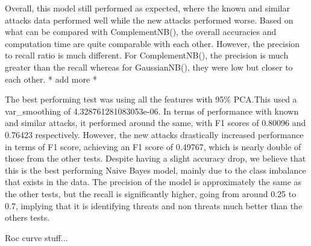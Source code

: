 Overall, this model still performed as expected, where the known and similar attacks data performed well while the new attacks performed worse. Based on what can be compared with ComplementNB(), the overall accuracies and computation time are quite comparable with each other. However, the precision to recall ratio is much different. For ComplementNB(), the precision is much greater than the recall whereas for GaussianNB(), they were low but closer to each other. * add more *

The best performing test was using all the features with 95\% PCA.This used a var\_smoothing of 4.328761281083053e-06. In terms of performance with known and similar attacks, it performed around the same, with F1 scores of 0.80096 and 0.76423 respectively. However, the new attacks drastically increased performance in terms of F1 score, achieving an F1 score of 0.49767, which is nearly double of those from the other tests. Despite having a slight accuracy drop, we believe that this is the best performing Naive Bayes model, mainly due to the class imbalance that exists in the data. The precision of the model is approximately the same as the other tests, but the recall is significantly higher, going from around 0.25 to 0.7, implying that it is identifying threats and non threats much better than the others tests.

Roc curve stuff...




